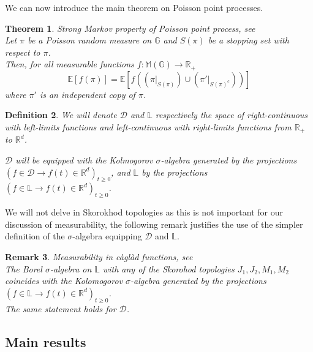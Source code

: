 \documentclass{article} %
\newtheorem{theorem}{Theorem}[section]
\newtheorem{definition}[theorem]{Definition}
\newtheorem{remark}[theorem]{Remark}
\newcommand{\1}{\mathbbm{1}} %
\newcommand{\R}{\mathbb{R}}
\begin{document}
We can now introduce the main theorem on Poisson point processes.
\begin{theorem}
\textit{Strong Markov property of Poisson point process}, see \cite[Theorem 12.1.3]{RPG}
\label{thm:strongmarkov}
\leavevmode \\
Let $\pi$ be a Poisson random measure on $\mathbb{G}$ and $S(\pi)$ be a stopping set with respect to $\pi$.\\
Then, for all measurable functions $f : \mathbb{M}(\mathbb{G}) \to \mathbb{R}_+$
\[
\mathbb{E}[f(\pi)] = \mathbb{E}[f((\pi|_{S(\pi)}) \cup (\pi'|_{S(\pi)^c}))]
\]
where $\pi'$ is an independent copy of $\pi$.
\end{theorem}

\begin{definition}
    We will denote $\mathcal{D}$ and $\mathbb{L}$ respectively the space of right-continuous with left-limits functions and left-continuous with right-limits functions from $\mathbb{R}_+$ to $\R^d$.

    $\mathcal{D}$ will be equipped with the Kolmogorov $\sigma$-algebra generated by the projections $(f \in \mathcal{D} \to f(t)\in \R^d)_{t \geq 0}$, and $\mathbb{L}$ by the projections $(f \in \mathbb{L} \to f(t)\in \R^d)_{t \geq 0}$.
\end{definition}

We will not delve in Skorokhod topologies as this is not important for our discussion of measurability, the following remark justifies the use of the simpler definition of the $\sigma$-algebra equipping $\mathcal{D}$ and $\mathbb{L}$.

\begin{remark}\textit{Measurability in càglàd functions}, see \cite[Theorem 11.5.2.]{SPL}
    \leavevmode \\
    The Borel $\sigma$-algebra on $\mathbb{L}$ with any of the Skorohod topologies $J_1, J_2, M_1, M_2$ coincides with the Kolomogorov $\sigma$-algebra generated by the projections $(f \in \mathbb{L} \to f(t) \in \R^d)_{t \geq 0}$.\\
    The same statement holds for $\mathcal{D}$.
\end{remark}

\subsection{Main results} \label{subsec:main_results}
\end{document}
